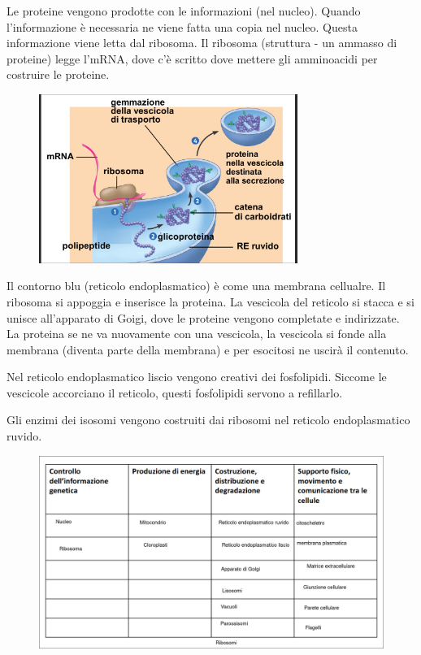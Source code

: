 \documentclass[a4paper]{article}
\begin{document}
Le proteine vengono prodotte con le informazioni (nel nucleo).
Quando l'informazione è necessaria ne viene fatta una copia nel nucleo.
Questa informazione viene letta dal ribosoma.
Il ribosoma (struttura - un ammasso di proteine) legge l'mRNA,
dove c'è scritto dove mettere gli amminoacidi per costruire le proteine.

\begin{figure}[th]
    \centering
    \includegraphics[width=0.75\textwidth]{./prod_cellula2.png}
\end{figure}

Il contorno blu (reticolo endoplasmatico) è come una membrana cellualre. Il ribosoma si appoggia e inserisce la proteina.
La vescicola del reticolo si stacca e si unisce all'apparato di Goigi, dove le proteine
vengono completate e indirizzate.
La proteina se ne va nuovamente con una vescicola, la vescicola si fonde alla membrana (diventa parte della membrana)
e per esocitosi ne uscirà il contenuto.

Nel reticolo endoplasmatico liscio vengono creativi dei fosfolipidi.
Siccome le vescicole accorciano il reticolo, questi fosfolipidi servono a refillarlo.

Gli enzimi dei isosomi vengono costruiti dai ribosomi nel reticolo endoplasmatico ruvido.

\pagebreak

\begin{figure}[th]
    \centering
    \includegraphics[width=\textwidth]{./strutture.png}
\end{figure}
\end{document}

